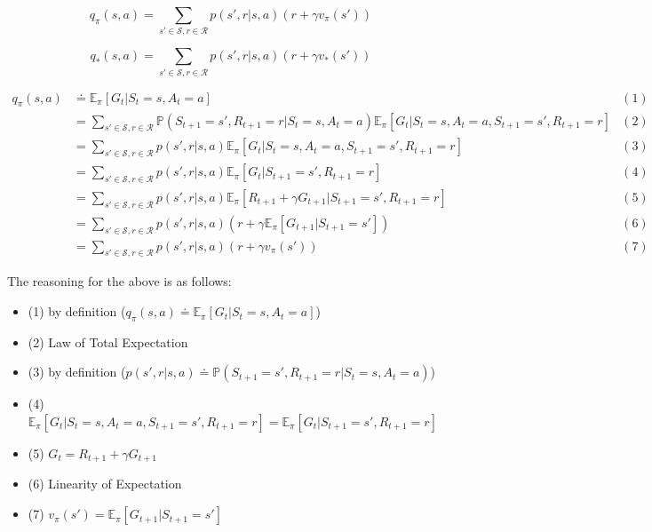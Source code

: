 \documentclass[10pt]{amsart}
\begin{document}
\begin{equation*}
q_\pi(s,a) = \sum_{s' \in \mathcal{S}, r\in\mathcal{R}}p(s',r|s,a)(r + \gamma v_\pi(s'))
\end{equation*}

\begin{equation*}
q_*(s,a) = \sum_{s' \in \mathcal{S}, r\in\mathcal{R}}p(s',r|s,a)(r + \gamma v_*(s'))
\end{equation*}

\begin{align*}
q_\pi(s,a) &\doteq \mathbb{E}_{\pi}[ G_t | S_t = s, A_t = a ] & (1)\\
&= \sum_{s' \in \mathcal{S}, r\in\mathcal{R}}\mathbb{P}(S_{t+1}=s', R_{t+1}=r|S_t=s, A_t=a)\mathbb{E}_{\pi}[ G_{t} | S_t = s, A_t = a, S_{t+1}=s', R_{t+1}=r] & (2)\\
&= \sum_{s' \in \mathcal{S}, r\in\mathcal{R}}p(s',r|s,a)\mathbb{E}_{\pi}[ G_{t} | S_t = s, A_t = a, S_{t+1}=s', R_{t+1}=r] & (3)\\
&= \sum_{s' \in \mathcal{S}, r\in\mathcal{R}}p(s',r|s,a)\mathbb{E}_{\pi}[ G_{t} | S_{t+1}=s', R_{t+1}=r] & (4)\\
&= \sum_{s' \in \mathcal{S}, r\in\mathcal{R}}p(s',r|s,a)\mathbb{E}_{\pi}[ R_{t+1} + \gamma G_{t+1} | S_{t+1}=s', R_{t+1}=r] & (5)\\
&= \sum_{s' \in \mathcal{S}, r\in\mathcal{R}}p(s',r|s,a)(r  + \gamma \mathbb{E}_\pi[G_{t+1} | S_{t+1}=s'] ) & (6)\\
&= \sum_{s' \in \mathcal{S}, r\in\mathcal{R}}p(s',r|s,a)(r  + \gamma v_\pi(s') ) & (7)
\end{align*}

\vspace{.5in}

The reasoning for the above is as follows:
\vspace{.2in}
\begin{itemize}
\item (1) by definition ($q_\pi(s,a) \doteq \mathbb{E}_{\pi}[ G_t | S_t = s, A_t = a ]$) \\
\item (2) Law of Total Expectation\\
\item (3) by definition ($p(s',r|s,a)\doteq\mathbb{P}(S_{t+1}=s', R_{t+1}=r|S_t=s, A_t=a)$)\\
\item (4) $\mathbb{E}_{\pi}[ G_{t} | S_t = s, A_t = a, S_{t+1}=s', R_{t+1}=r] = \mathbb{E}_{\pi}[ G_{t} | S_{t+1}=s', R_{t+1}=r]$\\
\item (5) $G_t = R_{t+1} + \gamma G_{t+1}$\\
\item (6) Linearity of Expectation\\
\item (7) $v_\pi(s') = \mathbb{E}_\pi[G_{t+1} | S_{t+1}=s']$
\end{itemize}
\end{document}
